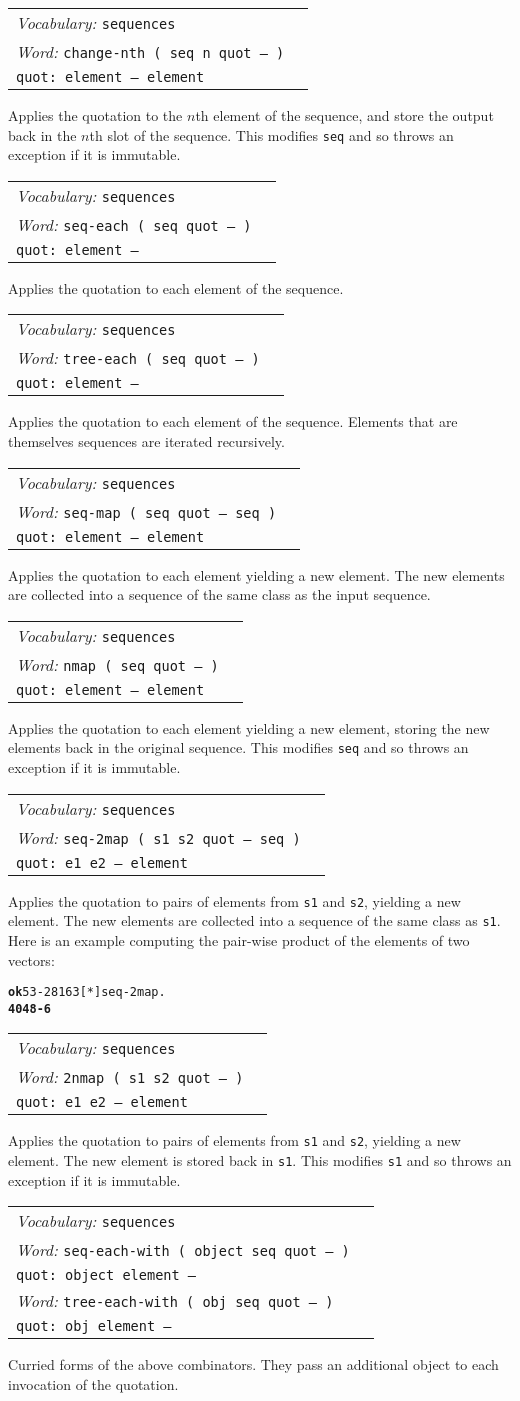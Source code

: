 \documentclass{book}
\newcommand{\tto}{\symbol{123}}
\newcommand{\ttc}{\symbol{125}}
\newcommand{\vocabulary}[1]{\emph{Vocabulary:} \texttt{#1}&\\}
\newcommand{\ordinaryword}[2]{\index{\texttt{#1}}\emph{Word:} \texttt{#2}&\\}
\newcommand{\wordtable}[1]{

\begin{tabularx}{12cm}[t]{lX}
\hline
#1
\hline
\end{tabularx}

}
\begin{document}
\wordtable{
\vocabulary{sequences}
\ordinaryword{change-nth}{change-nth ( seq n quot -- )}
\texttt{quot:~element -- element}\\
}
Applies the quotation to the $n$th element of the sequence, and store the output back in the $n$th slot of the sequence. This modifies \texttt{seq} and so throws an exception if it is immutable.
\wordtable{
\vocabulary{sequences}
\ordinaryword{seq-each}{seq-each ( seq quot -- )}
\texttt{quot:~element --}\\
}
Applies the quotation to each element of the sequence.
\wordtable{
\vocabulary{sequences}
\ordinaryword{tree-each}{tree-each ( seq quot -- )}
\texttt{quot:~element --}\\
}
Applies the quotation to each element of the sequence. Elements that are themselves sequences are iterated recursively.
\wordtable{
\vocabulary{sequences}
\ordinaryword{seq-map}{seq-map ( seq quot -- seq )}
\texttt{quot:~element -- element}\\
}
Applies the quotation to each element yielding a new element. The new elements are collected into a sequence of the same class as the input sequence.
\wordtable{
\vocabulary{sequences}
\ordinaryword{nmap}{nmap ( seq quot -- )}
\texttt{quot:~element -- element}\\
}
Applies the quotation to each element yielding a new element, storing the new elements back in the original sequence. This modifies \texttt{seq} and so throws an exception if it is immutable.
\wordtable{
\vocabulary{sequences}
\ordinaryword{seq-2map}{seq-2map ( s1 s2 quot -- seq )}
\texttt{quot:~e1 e2 -- element}\\
}
Applies the quotation to pairs of elements from \texttt{s1} and \texttt{s2}, yielding a new element. The new elements are collected into a sequence of the same class as \texttt{s1}. Here is an example computing the pair-wise product of the elements of two vectors:
\begin{alltt}
\textbf{ok} \tto 5 3 -2 \ttc \tto 8 16 3 \ttc [ * ] seq-2map .
\textbf{\tto 40 48 -6 \ttc}
\end{alltt}
\wordtable{
\vocabulary{sequences}
\ordinaryword{2nmap}{2nmap ( s1 s2 quot -- )}
\texttt{quot:~e1 e2 -- element}\\
}
Applies the quotation to pairs of elements from \texttt{s1} and \texttt{s2}, yielding a new element. The new element is stored back in \texttt{s1}. This modifies \texttt{s1} and so throws an exception if it is immutable.
\wordtable{
\vocabulary{sequences}
\ordinaryword{seq-each-with}{seq-each-with ( object seq quot -- )}
\texttt{quot:~object element --}\\
\ordinaryword{tree-each-with}{tree-each-with ( obj seq quot -- )}
\texttt{quot:~obj element --}\\
}
Curried forms of the above combinators. They pass an additional object to each invocation of the quotation.
\end{document}
